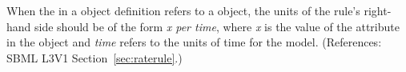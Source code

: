 When the  in a \RateRule object definition refers to a
\Parameter object, the units of the rule's right-hand side should be of the form
\emph{x per time}, where \emph{x} is the value of the 
attribute in the \Parameter object and \emph{time} refers to the units of
time for the model.  (References: SBML L3V1 Section~\ref{sec:raterule}.)
